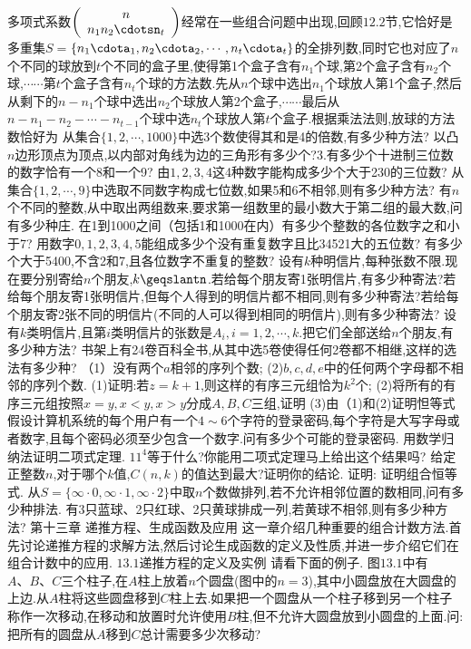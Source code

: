 多项式系数$\left(\begin{array}{c}n\\n_{1}n_{2}\cdotsn_{t}\end{array}\right)$经常在一些组合问题中出现,回顾$12.2$节,它恰好是多重集$S=$$\left\{n_{1}\cdota_{1},n_{2}\cdota_{2},\cdots,n_{t}\cdota_{t}\right\}$的全排列数,同时它也对应了$n$个不同的球放到$t$个不同的盒子里,使得第1个盒子含有$n_{1}$个球,第2个盒子含有$n_{2}$个球,$\cdots\cdots$第$t$个盒子含有$n_{t}$个球的方法数.先从$n$个球中选出$n_{1}$个球放人第1个盒子,然后从剩下的$n-n_{1}$个球中选出$n_{2}$个球放人第2个盒子,$\cdots\cdots$最后从$n-n_{1}-n_{2}-\cdots-n_{t-1}$个球中选$n_{t}$个球放人第$t$个盒子.根据乘法法则,放球的方法数恰好为
从集合$\{1,2,\cdots,1000\}$中选3个数使得其和是4的倍数,有多少种方法?
以凸$n$边形顶点为顶点,以内部对角线为边的三角形有多少个?3.有多少个十进制三位数的数字恰有一个8和一个9?
由$1,2,3,4$这4种数字能构成多少个大于230的三位数?
从集合$\{1,2,\cdots,9\}$中选取不同数字构成七位数,如果5和6不相邻,则有多少种方法?
有$n$个不同的整数,从中取出两组数来,要求第一组数里的最小数大于第二组的最大数,问有多少种庄.
在1到1000之间（包括1和1000在内）有多少个整数的各位数字之和小于7?
用数字$0,1,2,3,4,5$能组成多少个没有重复数字且比34521大的五位数?
有多少个大于5400,不含2和7,且各位数字不重复的整数?
设有$k$种明信片,每种张数不限.现在要分别寄给$n$个朋友,$k\geqslantn$.若给每个朋友寄1张明信片,有多少种寄法?若给每个朋友寄1张明信片,但每个人得到的明信片都不相同,则有多少种寄法?若给每个朋友寄2张不同的明信片(不同的人可以得到相同的明信片),则有多少种寄法?
设有$k$类明信片,且第$i$类明信片的张数是$A_{i},i=1,2,\cdots,k$.把它们全部送给$n$个朋友,有多少种方法?
书架上有24卷百科全书,从其中选5卷使得任何2卷都不相继,这样的选法有多少种?
（1）没有两个$a$相邻的序列个数;
(2)$b,c,d,e$中的任何两个字母都不相邻的序列个数.
(1)证明:若$z=k+1$,则这样的有序三元组恰为$k^{2}$个;
(2)将所有的有序三元组按照$x=y,x<y,x>y$分成$A,B,C$三组,证明
(3)由（1)和(2)证明怛等式
假设计算机系统的每个用户有一个$4\sim6$个字符的登录密码,每个字符是大写字母或者数字,且每个密码必须至少包含一个数字.问有多少个可能的登录密码.
用数学归纳法证明二项式定理.
$11^{4}$等于什么?你能用二项式定理马上给出这个结果吗?
给定正整数$n$,对于哪个$k$值,$C(n,k)$的值达到最大?证明你的结论.
证明:
证明组合恒等式.
从$S=\{\infty\cdot0,\infty\cdot1,\infty\cdot2\}$中取$n$个数做排列,若不允许相邻位置的数相同,问有多少种排法.
有3只蓝球、2只红球、2只黄球排成一列,若黄球不相邻,则有多少种方法?
{第十三章}
{递推方程、生成函数及应用}
这一章介绍几种重要的组合计数方法.首先讨论递推方程的求解方法,然后讨论生成函数的定义及性质,并进一步介绍它们在组合计数中的应用.
{$13.1$递推方程的定义及实例}
请看下面的例子.
图$13.1$中有$A、B、C$三个柱子,在$A$柱上放着$n$个圆盘(图中的$n=3$),其中小圆盘放在大圆盘的上边.从$A$柱将这些圆盘移到$C$柱上去.如果把一个圆盘从一个柱子移到另一个柱子称作一次移动,在移动和放置时允许使用$B$柱,但不允许大圆盘放到小圆盘的上面.问:把所有的圆盘从$A$移到$C$总计需要多少次移动?
$$
